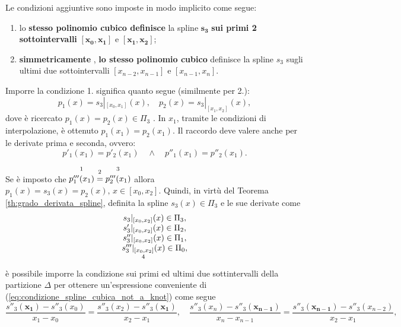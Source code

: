 Le condizioni aggiuntive sono imposte in modo implicito come segue:
\begin{enumerate}
    \item lo \textbf{stesso polinomio cubico definisce} la spline $\boldsymbol{s_3}$ \textbf{sui primi 2 sottointervalli} $\boldsymbol{[x_0,x_1]}$ e $\boldsymbol{[x_1,x_2]}$;
    \item \textbf{simmetricamente} \footnotemark , \textbf{lo stesso polinomio cubico} definisce la spline $s_3$ sugli ultimi due sottointervalli $[x_{n-2},x_{n-1}]$ e $[x_{n-1},x_n]$.
\end{enumerate}

Imporre la condizione 1. significa quanto segue (similmente per 2.):
\begin{equation*}
    p_1(x)=s_3|_{[x_0,x_1]}(x),\quad p_2(x)=s_3|_{[x_1,x_2]}(x),
\end{equation*}
dove è ricercato $p_1(x)=p_2(x)\in\Pi_3$ \footnotemark. In $x_1$, tramite le condizioni di interpolazione, è ottenuto $p_1(x_1)=p_2(x_1)$. Il raccordo deve valere anche per le derivate prima e seconda, ovvero:
\begin{equation*}
    p'_1(x_1)=p'_2(x_1)\quad\land\quad p''_1(x_1)=p''_2(x_1).
\end{equation*}

Se è imposto che $\overset{\footnotemark}{p'''_1(x_1)}\overset{\footnotemark}{=}\overset{\footnotemark}{p'''_2(x_1)}$ allora $p_1(x)=s_3(x)=p_2(x),\, x\in [x_0,x_2]$. Quindi, in virtù del Teorema \ref{th:grado_derivata_spline}, definita la spline $s_3(x)\in\Pi_3$ e le sue derivate come 
\begin{equation*}
    \begin{matrix}
        s_3|_{[x_0,x_2]}(x)\in\Pi_3,\\
        s'_3|_{[x_0,x_2]}(x)\in\Pi_2,\\
        s''_3|_{[x_0,x_2]}(x)\in\Pi_1,\\
        \underset{\footnotemark}{s'''_3|_{[x_0,x_2]}(x)}\in\Pi_0,
    \end{matrix}
\end{equation*}
è possibile imporre la condizione sui primi ed ultimi due sottintervalli della partizione $\Delta$ per ottenere un'espressione conveniente di (\ref{eq:condizione_spline_cubica_not_a_knot}) come segue
\begin{equation}\label{eq:condizioni_spline_not_a_knot_convenienti}
    \frac{s''_3(\boldsymbol{x_1})-s''_3(x_0)}{x_1-x_0}=\frac{s''_3(x_2)-s''_3(\boldsymbol{x_1})}{x_2-x_1}, \quad \frac{s''_3(x_n)-s''_3(\boldsymbol{x_{n-1}})}{x_n-x_{n-1}}=\frac{s''_3(\boldsymbol{x_{n-1}})-s''_3(x_{n-2})}{x_2-x_1},
\end{equation}

